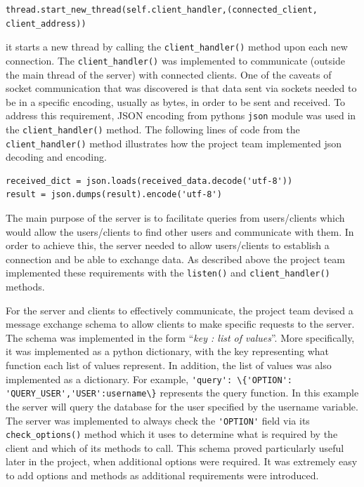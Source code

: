 \documentclass[finalReport.tex]{subfiles}
\begin{document}
\begin{lstlisting}
thread.start_new_thread(self.client_handler,(connected_client, client_address))
\end{lstlisting}

it starts a new thread by calling the \lstinline'client_handler()' method upon each new connection. The \lstinline'client_handler()' was implemented to communicate (outside the main thread of the server) with connected clients.  One of the caveats of socket communication that was discovered is that data sent via sockets needed to be in a specific encoding, usually as bytes, in order to be sent and received. To address this requirement, JSON encoding from pythons \lstinline'json' module was used in the \lstinline'client_handler()' method. The following lines of code from the \lstinline'client_handler()' method illustrates how the project team implemented json decoding and encoding.

\begin{lstlisting}
received_dict = json.loads(received_data.decode('utf-8'))
result = json.dumps(result).encode('utf-8')
\end{lstlisting}

The main purpose of the server is to facilitate queries from users/clients which would allow the users/clients to find other users and communicate with them. In order to achieve this, the server needed to allow users/clients to establish a connection and be able to exchange data. As described above the project team implemented these requirements with the \lstinline'listen()' and \lstinline'client_handler()' methods.

For the server and clients to effectively communicate, the project team devised a message exchange schema to allow clients to make specific requests to the server. The schema was implemented in the form ``\textit{key : list of values}''. More specifically, it was implemented as a python dictionary, with the key representing what function each list of values represent. In addition, the list of values was also implemented as a dictionary. For example, \lstinline-'query': \{'OPTION': 'QUERY_USER','USER':username\}- represents the query function. In this example the server will query the database for the user specified by the username variable. The server was implemented to always check the \lstinline-'OPTION'- field via its \lstinline'check_options()' method which it uses to determine what is required by the client and which of its methods to call. This schema proved particularly useful later in the project, when additional options were required. It was extremely easy to add options and methods as additional requirements were introduced.
\end{document}
